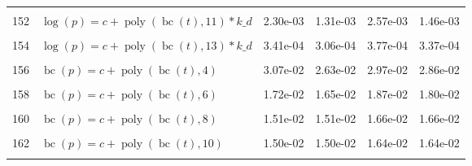 \documentclass[12pt,a4paper]{article}
\DeclareMathOperator{\bc}{bc}
\DeclareMathOperator{\poly}{poly}
\begin{document}
\begin{longtable}[t]{ll>{\raggedleft\arraybackslash}p{2cm}>{\raggedleft\arraybackslash}p{2cm}>{\raggedleft\arraybackslash}p{2cm}>{\raggedleft\arraybackslash}p{2cm}}
\cellcolor{gray!6}{151} & \cellcolor{gray!6}{$\log(p) = c + \poly\left( \bc(t), 10 \right) * k\_d$} & \cellcolor{gray!6}{5.43e-03} & \cellcolor{gray!6}{4.43e-03} & \cellcolor{gray!6}{6.06e-03} & \cellcolor{gray!6}{4.93e-03}\\
152 & $\log(p) = c + \poly\left( \bc(t), 11 \right) * k\_d$ & 2.30e-03 & 1.31e-03 & 2.57e-03 & 1.46e-03\\
\cellcolor{gray!6}{153} & \cellcolor{gray!6}{$\log(p) = c + \poly\left( \bc(t), 12 \right) * k\_d$} & \cellcolor{gray!6}{6.01e-04} & \cellcolor{gray!6}{5.37e-04} & \cellcolor{gray!6}{6.68e-04} & \cellcolor{gray!6}{5.95e-04}\\
154 & $\log(p) = c + \poly\left( \bc(t), 13 \right) * k\_d$ & 3.41e-04 & 3.06e-04 & 3.77e-04 & 3.37e-04\\
\cellcolor{gray!6}{155} & \cellcolor{gray!6}{$\bc(p) = c + \poly\left( \bc(t), 3 \right)$} & \cellcolor{gray!6}{3.98e-02} & \cellcolor{gray!6}{2.43e-02} & \cellcolor{gray!6}{2.72e-02} & \cellcolor{gray!6}{2.63e-02}\\
156 & $\bc(p) = c + \poly\left( \bc(t), 4 \right)$ & 3.07e-02 & 2.63e-02 & 2.97e-02 & 2.86e-02\\
\cellcolor{gray!6}{157} & \cellcolor{gray!6}{$\bc(p) = c + \poly\left( \bc(t), 5 \right)$} & \cellcolor{gray!6}{1.81e-02} & \cellcolor{gray!6}{1.77e-02} & \cellcolor{gray!6}{1.89e-02} & \cellcolor{gray!6}{1.89e-02}\\
158 & $\bc(p) = c + \poly\left( \bc(t), 6 \right)$ & 1.72e-02 & 1.65e-02 & 1.87e-02 & 1.80e-02\\
\cellcolor{gray!6}{159} & \cellcolor{gray!6}{$\bc(p) = c + \poly\left( \bc(t), 7 \right)$} & \cellcolor{gray!6}{1.71e-02} & \cellcolor{gray!6}{1.64e-02} & \cellcolor{gray!6}{1.85e-02} & \cellcolor{gray!6}{1.79e-02}\\
160 & $\bc(p) = c + \poly\left( \bc(t), 8 \right)$ & 1.51e-02 & 1.51e-02 & 1.66e-02 & 1.66e-02\\
\cellcolor{gray!6}{161} & \cellcolor{gray!6}{$\bc(p) = c + \poly\left( \bc(t), 9 \right)$} & \cellcolor{gray!6}{1.51e-02} & \cellcolor{gray!6}{1.51e-02} & \cellcolor{gray!6}{1.66e-02} & \cellcolor{gray!6}{1.66e-02}\\
162 & $\bc(p) = c + \poly\left( \bc(t), 10 \right)$ & 1.50e-02 & 1.50e-02 & 1.64e-02 & 1.64e-02\\
\cellcolor{gray!6}{163} & \cellcolor{gray!6}{$\bc(p) = c + \poly\left( \bc(t), 11 \right)$} & \cellcolor{gray!6}{1.50e-02} & \cellcolor{gray!6}{1.49e-02} & \cellcolor{gray!6}{1.64e-02} & \cellcolor{gray!6}{1.64e-02}\\

\end{longtable}
\end{document}
